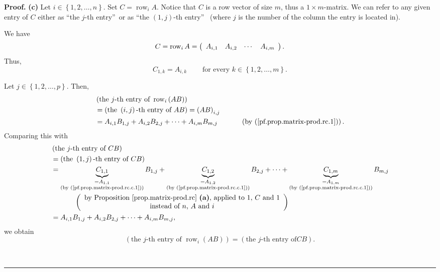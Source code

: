 \documentclass[numbers=enddot,12pt,final,onecolumn,notitlepage]{scrartcl}%
\theoremstyle{definition}
\newenvironment{proof}[1][Proof]{\noindent\textbf{#1.} }{\ \rule{0.5em}{0.5em}}
\begin{document}
\begin{proof}
\textbf{(c)} Let $i\in\left\{  1,2,\ldots,n\right\}  $. Set
$C=\operatorname*{row}\nolimits_{i}A$. Notice that $C$ is a row vector of size
$m$, thus a $1\times m$-matrix. We can refer to any given entry of $C$ either
as \textquotedblleft the $j$-th entry\textquotedblright\ or as
\textquotedblleft the $\left(  1,j\right)  $-th entry\textquotedblright%
\ (where $j$ is the number of the column the entry is located in).

We have%
\[
C=\operatorname*{row}\nolimits_{i}A=\left(
\begin{array}
[c]{cccc}%
A_{i,1} & A_{i,2} & \cdots & A_{i,m}%
\end{array}
\right)  .
\]
Thus,%
\begin{equation}
C_{1,k}=A_{i,k}\ \ \ \ \ \ \ \ \ \ \text{for every }k\in\left\{
1,2,\ldots,m\right\}  .\label{pf.prop.matrix-prod.rc.c.1}%
\end{equation}


Let $j\in\left\{  1,2,\ldots,p\right\}  $. Then,%
\begin{align*}
&  \left(  \text{the }j\text{-th entry of }\operatorname*{row}\nolimits_{i}%
\left(  AB\right)  \right)  \\
&  =\left(  \text{the }\left(  i,j\right)  \text{-th entry of }AB\right)
=\left(  AB\right)  _{i,j}\\
&  =A_{i,1}B_{1,j}+A_{i,2}B_{2,j}+\cdots+A_{i,m}B_{m,j}%
\ \ \ \ \ \ \ \ \ \ \left(  \text{by (\ref{pf.prop.matrix-prod.rc.1})}\right)
.
\end{align*}
Comparing this with%
\begin{align*}
&  \left(  \text{the }j\text{-th entry of }CB\right)  \\
&  =\left(  \text{the }\left(  1,j\right)  \text{-th entry of }CB\right)  \\
&  =\underbrace{C_{1,1}}_{\substack{=A_{1,1}\\\text{(by
(\ref{pf.prop.matrix-prod.rc.c.1}))}}}B_{1,j}+\underbrace{C_{1,2}%
}_{\substack{=A_{1,2}\\\text{(by (\ref{pf.prop.matrix-prod.rc.c.1}))}}%
}B_{2,j}+\cdots+\underbrace{C_{1,m}}_{\substack{=A_{1,m}\\\text{(by
(\ref{pf.prop.matrix-prod.rc.c.1}))}}}B_{m,j}\\
&  \ \ \ \ \ \ \ \ \ \ \left(
\begin{array}
[c]{c}%
\text{by Proposition \ref{prop.matrix-prod.rc} \textbf{(a)}, applied to
}1\text{, }C\text{ and }1\\
\text{instead of }n\text{, }A\text{ and }i
\end{array}
\right)  \\
&  =A_{i,1}B_{1,j}+A_{i,2}B_{2,j}+\cdots+A_{i,m}B_{m,j},
\end{align*}
we obtain%
\begin{equation}
\left(  \text{the }j\text{-th entry of }\operatorname*{row}\nolimits_{i}%
\left(  AB\right)  \right)  =\left(  \text{the }j\text{-th entry of
}CB\right)  .\label{pf.prop.matrix-prod.rc.c.5}%
\end{equation}



\end{proof}
\end{document}
